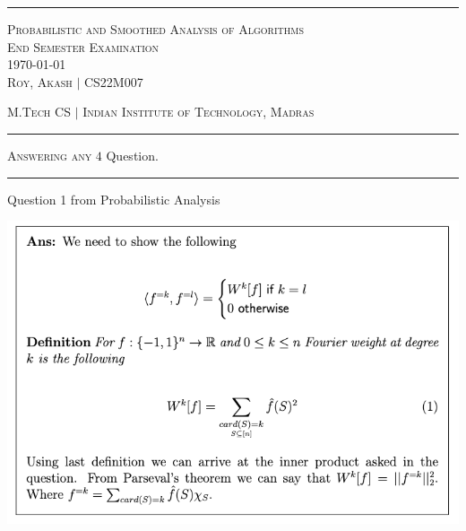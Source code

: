 \documentclass[12pt, a4paper, onecolumn]{exam}
\begin{document}
\hrule
\vspace{1em}

\begingroup
\centering
\large \textsc{Probabilistic and Smoothed Analysis of Algorithms}\\
\large \textsc{End Semester Examination}\\[0.5em]
\large \today\\[0.5em]
\large \textsc{Roy, Akash} $\mid$ CS22M007\par
\large \textsc{M.Tech CS} $\mid$ \textsc{Indian Institute of Technology, Madras}\par
\endgroup
\pointsdroppedatright %
\printanswers
\renewcommand{\solutiontitle}{\noindent\textbf{Ans:}\enspace}   %

\vspace{1em}
\hrule
\vspace{0.2em}

\begin{center}
	\textsc{Answering any} $4$ Question.
\end{center}

\vspace{0.2em}
\hrule
\vspace{1em}

\begin{questions}

    \question Question 1 from Probabilistic Analysis

    \includegraphics[]{question1}
    
    \begin{solution}
        
    \end{solution}

\end{questions}
\end{document}
